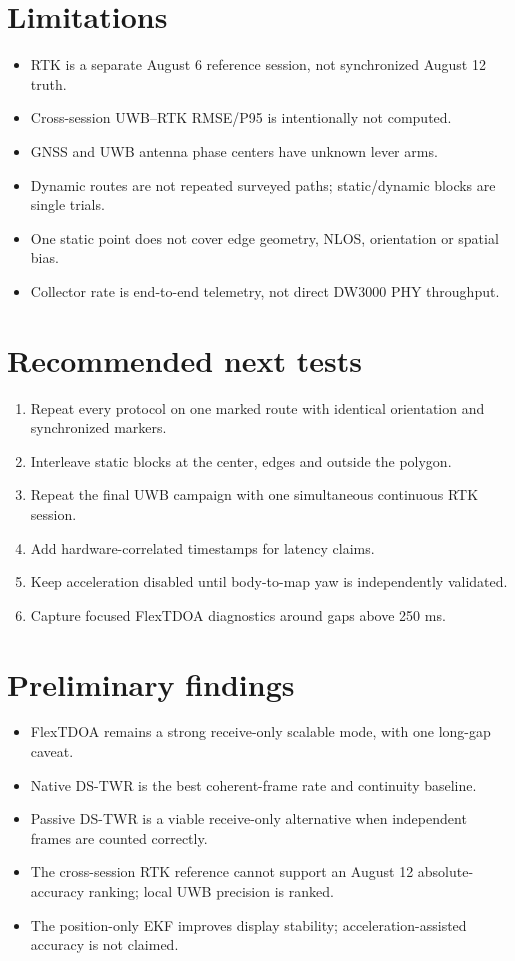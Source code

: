 \documentclass[10pt,a4paper]{article}
\begin{document}
\section{Limitations}
\begin{itemize}
\item RTK is a separate August 6 reference session, not synchronized August 12 truth.
\item Cross-session UWB--RTK RMSE/P95 is intentionally not computed.
\item GNSS and UWB antenna phase centers have unknown lever arms.
\item Dynamic routes are not repeated surveyed paths; static/dynamic blocks are single trials.
\item One static point does not cover edge geometry, NLOS, orientation or spatial bias.
\item Collector rate is end-to-end telemetry, not direct DW3000 PHY throughput.
\end{itemize}

\section{Recommended next tests}
\begin{enumerate}
\item Repeat every protocol on one marked route with identical orientation and synchronized markers.
\item Interleave static blocks at the center, edges and outside the polygon.
\item Repeat the final UWB campaign with one simultaneous continuous RTK session.
\item Add hardware-correlated timestamps for latency claims.
\item Keep acceleration disabled until body-to-map yaw is independently validated.
\item Capture focused FlexTDOA diagnostics around gaps above 250 ms.
\end{enumerate}

\section{Preliminary findings}
\begin{itemize}
\item FlexTDOA remains a strong receive-only scalable mode, with one long-gap caveat.
\item Native DS-TWR is the best coherent-frame rate and continuity baseline.
\item Passive DS-TWR is a viable receive-only alternative when independent frames are counted correctly.
\item The cross-session RTK reference cannot support an August 12 absolute-accuracy ranking; local UWB precision is ranked.
\item The position-only EKF improves display stability; acceleration-assisted accuracy is not claimed.
\end{itemize}
\end{document}
